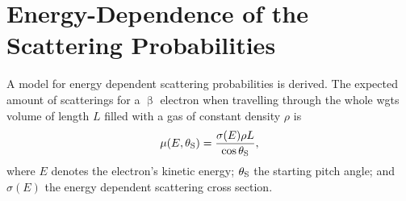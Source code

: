 \section{Energy-Dependence of the Scattering Probabilities}
\label{sec:energyDepOfScatProbsAppendix}
A model for energy dependent scattering probabilities is derived. The expected amount of scatterings for a $\upbeta$ electron when travelling  through the whole \gls{wgts} volume of length $L$ filled with a gas of constant density $\rho$ is
\begin{equation}
    \mu(E,\theta_\mathrm{S}) =
    \frac{\sigma(E)\rho L}{\cos\theta_\mathrm{S}},
\end{equation}
where $E$ denotes the electron's kinetic energy; $\theta_\mathrm{S}$ the starting pitch angle; and $\sigma(E)$ the energy dependent scattering cross section.

